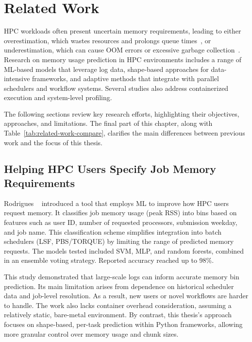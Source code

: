 \chapter{Related Work}
\label{ch:related-work}

\ac{HPC} workloads often present uncertain memory requirements, leading to either overestimation, which wastes resources and prolongs queue times~\cite{tanash2021ampro}, or underestimation, which can cause \ac{OOM} errors or excessive garbage collection~\cite{myung2021}.
Research on memory usage prediction in \ac{HPC} environments includes a range of \ac{ML}-based models that leverage log data, shape-based approaches for data-intensive frameworks, and adaptive methods that integrate with parallel schedulers and workflow systems.
Several studies also address containerized execution and system-level profiling.

The following sections review key research efforts, highlighting their objectives, approaches, and limitations.
The final part of this chapter, along with Table~\ref{tab:related-work-compare}, clarifies the main differences between previous work and the focus of this thesis.


\section{Helping HPC Users Specify Job Memory Requirements}
\label{sec:rw-helping-hpc-users}

Rodrigues \etal~\cite{rodrigues2016} introduced a tool that employs \ac{ML} to improve how \ac{HPC} users request memory.
It classifies job memory usage (peak \ac{RSS}) into bins based on features such as user ID, number of requested processors, submission weekday, and job name.
This classification scheme simplifies integration into batch schedulers (\ac{LSF}, \ac{PBS}/\ac{TORQUE}) by limiting the range of predicted memory requests.
The models tested included \ac{SVM}, \ac{MLP}, and random forests, combined in an ensemble voting strategy.
Reported accuracy reached up to 98\%.

This study demonstrated that large-scale logs can inform accurate memory bin prediction.
Its main limitation arises from dependence on historical scheduler data and job-level resolution.
As a result, new users or novel workflows are harder to handle.
The work also lacks container overhead consideration, assuming a relatively static, bare-metal environment.
By contrast, this thesis's approach focuses on shape-based, per-task prediction within Python frameworks, allowing more granular control over memory usage and chunk sizes.


